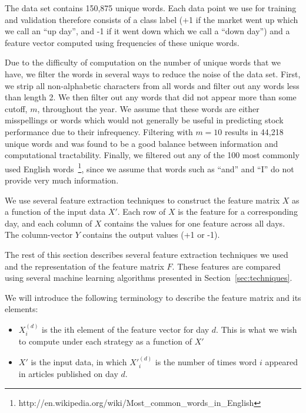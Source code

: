 \documentclass[10pt, twocolumn]{article}
\begin{document}
The data set contains 150,875 unique words. Each data point we use for training and validation therefore consists of a class label (+1 if the market went up which we call an ``up day'', and -1 if it went down which we call a ``down day'') and a feature vector computed using frequencies of these unique words.

Due to the difficulty of computation on the number of unique words that we have, we filter the words in several ways to reduce the noise of the data set. First, we strip all non-alphabetic characters from all words and filter out any words less than length 2. We then filter out any words that did not appear more than some cutoff, $m$, throughout the year. We assume that these words are either misspellings or words which would not generally be useful in predicting stock performance due to their infrequency. Filtering with $m = 10$ results in 44,218 unique words and was found to be a good balance between information and computational tractability.
Finally, we filtered out any of the 100 most commonly used English words~\footnote{http://en.wikipedia.org/wiki/Most\_common\_words\_in\_English}, since we
assume that words such as ``and'' and ``I'' do not provide very much information.

We use several feature extraction techniques to construct the feature matrix $X$ as a function of the input data $X'$. Each row of $X$ is the feature for a corresponding day, and each column of $X$
contains the values for one feature across all days. The column-vector $Y$ contains the output values (+1 or -1). 

The rest of this section describes several feature extraction techniques we used and the representation of the feature matrix $F$.  These features are compared using several machine learning algorithms presented in Section~\ref{sec:techniques}.

We will introduce the following terminology to describe the feature matrix and its elements:

\begin{itemize}


\item $X^{(d)}_{i}$ is the ith element of the feature vector for day $d$. This is what we wish to compute under each strategy as a function of $X'$

\item $X'$ is the input data, in which $X'^{(d)}_i$ is the number of times word $i$ appeared in articles published on day $d$.


\end{itemize}
\end{document}
